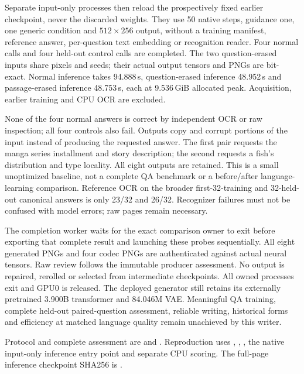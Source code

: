 Separate input-only processes then reload the prospectively fixed earlier
checkpoint, never the discarded weights. They use 50 native steps, guidance
one, one generic condition and $512\times256$ output, without a training
manifest, reference answer, per-question text embedding or recognition reader.
Four normal calls and four held-out control calls are completed. The two
question-erased inputs share pixels and seeds; their actual output tensors
and PNGs are bit-exact. Normal inference takes 94.888\,s, question-erased
inference 48.952\,s and passage-erased inference 48.753\,s, each at
9.536\,GiB allocated peak. Acquisition, earlier training and CPU OCR are excluded.

None of the four normal answers is correct by independent OCR or raw inspection;
all four controls also fail. Outputs copy and corrupt portions of the input
instead of producing the requested answer. The first pair requests the manga
series installment and story description; the second requests a fish's
distribution and type locality. All eight outputs are retained. This is a
small unoptimized baseline, not a complete QA benchmark or a before/after
language-learning comparison. Reference OCR on the broader first-32-training
and 32-held-out canonical answers is only 23/32 and 26/32. Recognizer failures
must not be confused with model errors; raw pages remain necessary.

The completion worker waits for the exact comparison owner to exit before
exporting that complete result and launching these probes sequentially.
All eight generated PNGs and four codec PNGs are authenticated against actual
neural tensors. Raw review follows the immutable producer assessment. No
output is repaired, rerolled or selected from intermediate checkpoints. All
owned processes exit and GPU0 is released. The deployed generator still
retains its externally pretrained 3.900B transformer and 84.046M VAE.
Meaningful QA training, complete held-out paired-question assessment, reliable
writing, historical forms and efficiency at matched language quality remain
unachieved by this writer.

{\footnotesize\raggedright
Protocol and complete assessment are
 and
.
Reproduction uses ,
,
, the native input-only
inference entry point and separate CPU scoring. The full-page inference
checkpoint SHA256 is
.\par}

